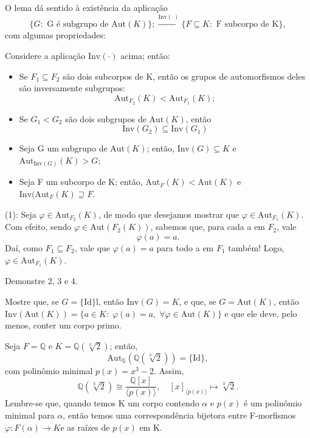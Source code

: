 \documentclass[../algebraIII_notes.tex]{subfiles}
\begin{document}
O lema dá sentido à existência da aplicação
\[
	\{G: \text{ G é subgrupo de }\mathrm{Aut}(K)\};\stackrel{\mathrm{Inv}(\cdot )}\longrightarrow \{F\subseteq K: \text{ F subcorpo de K}\},
\]
com algumas propriedades:
\begin{lemma*}
	Considere a aplicação \(\mathrm{Inv}(\cdot )\) acima; então:
	\begin{itemize}
		\item[1)] Se \(F_1\subseteq F_2\) são dois subcorpos de K, então os grupos de automorfismos deles são inversamente subgrupos:
		      \[
			      \mathrm{Aut}_{F_{2}}(K) < \mathrm{Aut}_{F_1}(K);
		      \]
		\item[2)] Se \(G_1 < G_2\) são dois subgrupos de \(\mathrm{Aut}(K)\), então
		      \[
			      \mathrm{Inv}(G_2)\subseteq \mathrm{Inv}(G_1)
		      \]
		\item[3)] Seja G um subgrupo de \(\mathrm{Aut}(K)\); então, \(\mathrm{Inv}(G)\subseteq K\) e \(\mathrm{Aut}_{\mathrm{Inv}(G)}(K)>G\);
		\item[4)] Seja F um subcorpo de K; então, \(\mathrm{Aut}_{F}(K) < \mathrm{Aut}(K)\) e \(\mathrm{Inv}(\mathrm{Aut}_{F}(K)\supseteq F\).
	\end{itemize}
\end{lemma*}
\begin{proof*}
	(1): Seja \(\varphi \in \mathrm{Aut}_{F_{2}}(K)\), de modo que desejamos mostrar que \(\varphi \in \mathrm{Aut}_{F_{1}}(K)\). Com efeito, sendo \(\varphi \in \mathrm{Aut}(F_{2}(K))\), sabemos que, para cada a em \(F_{2}\), vale
	\[
		\varphi (a) = a.
	\]
	Daí, como \(F_{1}\subseteq F_{2}\), vale que \(\varphi (a) = a\) para todo a em \(F_{1}\) também! Logo, \(\varphi \in \mathrm{Aut}_{F_{1}}(K)\). \qedsymbol
\end{proof*}
\begin{exr}
	Demonstre 2, 3 e 4.
\end{exr}
\begin{exr}
	Mostre que, se \(G = \{\mathrm{Id}\}\)l, então \(\mathrm{Inv}(G)=K\), e que, se \(G = \mathrm{Aut}(K)\), então \(\mathrm{Inv}(\mathrm{Aut}(K)) = \{a\in K:\; \varphi (a) = a,\; \forall \varphi \in \mathrm{Aut}(K)\}\) e que ele deve, pelo menos, conter um corpo primo.
\end{exr}
\begin{example}
	Seja \(F = \mathbb{Q}\) e \(K = \mathbb{Q}(\sqrt[3]{2})\); então,
	\[
		\mathrm{Aut}_{\mathbb{Q}}(\mathbb{Q}(\sqrt[3]{2})) = \{\mathrm{Id}\},
	\]
	com polinômio minimal \(p(x) = x^{3} - 2\). Assim,
	\[
		\mathbb{Q}(\sqrt[3]{2}) \cong \frac{\mathbb{Q}[x]}{\langle p(x) \rangle}, \quad [x]_{\langle p(x) \rangle}\mapsto \sqrt[3]{2}.
	\]
	Lembre-se que, quando temos K um corpo contendo \(\alpha \) e \(p(x)\) é um polinômio minimal para \(\alpha \), então temos uma correspondência bijetora entre F-morfismos \(\varphi :F(\alpha )\rightarrow K\)e as raízes de \(p(x)\) em K.
\end{example}
\end{document}
